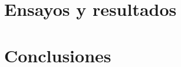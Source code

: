 \documentclass[11pt,a4paper]{article}
\begin{document}
\newpage
\section{Ensayos y resultados}









\newpage
\section{Conclusiones}




\newpage

\end{document}
